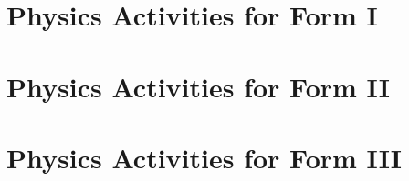 \documentclass[10pt,a4paper,twoside]{report}
\begin{document}

%
%

\tableofcontents




\chapter{Physics Activities for Form I}
%
%
%
%
%
%
%
%
%

%
%
%
%
%
%
%


\chapter{Physics Activities for Form II}
%
%
%
%
%
%
%

%
%
%
%
%
%
%
%
%


\chapter{Physics Activities for Form III}
%
%
%
%
%
%
%
\end{document}

